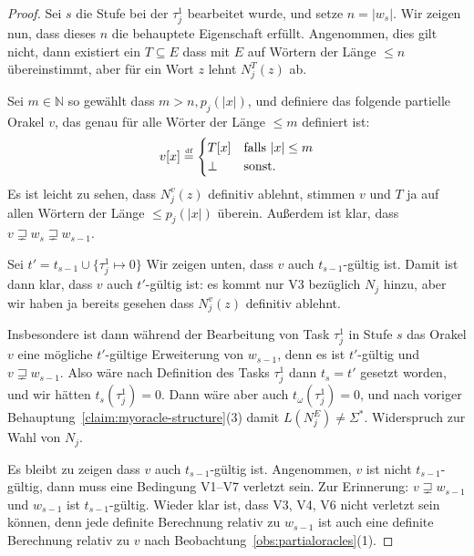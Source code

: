 \begin{proof}
    Sei $s$ die Stufe bei der $\tau^1_j$ bearbeitet wurde, 
    und setze $n=|w_{s}|$.
    Wir zeigen nun, dass dieses $n$ die behauptete Eigenschaft erfüllt.
    Angenommen, dies gilt nicht, dann existiert ein $T\subseteq E$ dass mit $E$ auf Wörtern der Länge $\leq n$ übereinstimmt, aber für ein Wort $z$ lehnt $N_j^T(z)$ ab.

    Sei $m\in\mathbb N$ so gewählt dass $m> n, p_j(|x|)$, und definiere das folgende partielle Orakel $v$, das genau für alle Wörter der Länge $\leq m$ definiert ist:
    \[ v[x] \stackrel{\text{\smash{\tiny df}}}{=} \begin{cases} T[x] & \text{falls $|x|\leq m$} \\ \bot & \text{sonst}. \end{cases}\]
    Es ist leicht zu sehen, dass $N_j^v(z)$ definitiv ablehnt, stimmen $v$ und $T$ ja auf allen Wörtern der Länge $\leq p_j(|x|)$ überein.
    Außerdem ist klar, dass $v\sqsupsetneq w_s \sqsupsetneq w_{s-1}$.

    Sei $t'=t_{s-1}\cup \{\tau^1_j\mapsto 0\}$
    Wir zeigen unten, dass $v$ auch $t_{s-1}$-gültig ist. Damit ist dann klar,
    dass $v$ auch $t'$-gültig ist: es kommt nur V3 bezüglich $N_j$ hinzu, aber wir haben ja bereits gesehen dass $N_j^v(z)$ definitiv ablehnt.

    Insbesondere ist dann während der Bearbeitung von Task $\tau^1_{j}$ in Stufe $s$ das Orakel $v$ eine mögliche $t'$-gültige Erweiterung von $w_{s-1}$, denn es ist $t'$-gültig und $v\sqsupsetneq w_{s-1}$. Also wäre nach Definition des Tasks $\tau^1_{j}$ dann $t_{s}=t'$ gesetzt worden,
    und wir hätten $t_s(\tau^1_j)=0$.
    Dann wäre aber auch $t_\omega(\tau^1_j)=0$, und nach voriger Behauptung~\ref{claim:myoracle-structure}(3) damit $L(N_j^E)\neq\Sigma^*$. Widerspruch zur Wahl von $N_j$.

    Es bleibt zu zeigen dass $v$ auch $t_{s-1}$-gültig ist. Angenommen, $v$ ist nicht $t_{s-1}$-gültig, dann muss eine Bedingung V1--V7 verletzt sein. Zur Erinnerung: $v\sqsupsetneq w_{s-1}$ und $w_{s-1}$ ist $t_{s-1}$-gültig.
    Wieder klar ist, dass V3, V4, V6 nicht verletzt sein können, denn jede definite Berechnung relativ zu $w_{s-1}$ ist auch eine definite Berechnung relativ zu $v$ nach Beobachtung~\ref{obs:partialoracles}(1).


\end{proof}
